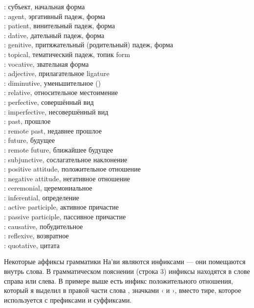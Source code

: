 \begin{multicols}{2}
\noindent{}: субъект, начальная форма \\
: agent, эргативный падеж, форма  \\
: patient, винительный падеж, форма  \\
: dative, дательный падеж, форма  \\
: genitive, притяжательный (родительный) падеж, форма  \\
: topical, тематический падеж, топик  form \\
: vocative, звательная форма  \\
: adjective, прилагательное  ligature\\
: diminutive, уменьшительное () \\
: relative, относительное местоимение  \\
: perfective, совершённый вид \\
: imperfective, несовершённый вид \\
: past, прошлое \\
: remote past, недавнее прошлое \\
: future, будущее \\
: remote future, ближайшее будущее \\
: subjunctive, сослагательное наклонение \\
: positive attitude, положительное отношение \\
: negative attitude, негативное отношение \\
: ceremonial, церемониальное \\
: inferential, определение \\
: active participle, активное причастие \\
: passive participle, пассивное причастие \\
: causative, побудительное \\
: reflexive, возвратное \\
: quotative, цитата 
\end{multicols}

\noindent Некоторые аффиксы грамматики На'ви являются инфиксами — они помещаются внутрь слова.  В грамматическом пояснении (строка 3) инфиксы находятся в слове справа или слева.  В примере выше есть инфикс положительного отношения, который я выделил в правой части слова , значками ‹
и ›, вместо тире, которое используется с префиксами и суффиксами.

